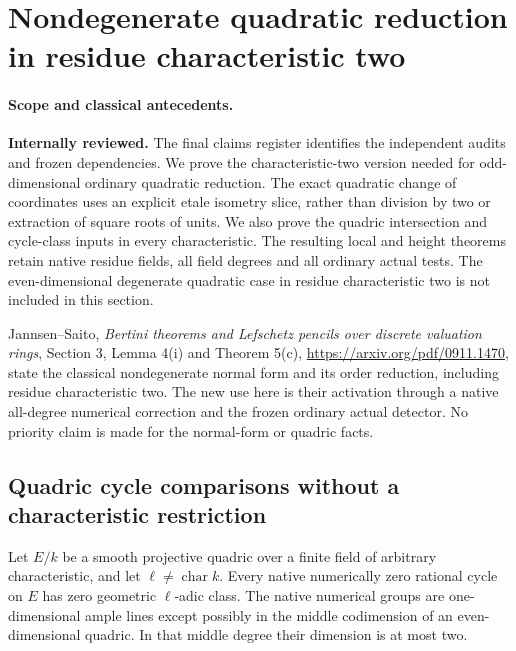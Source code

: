 \section{Nondegenerate quadratic reduction in residue characteristic two}
\label{r17c2:section}

\paragraph{Scope and classical antecedents.}
\textbf{Internally reviewed.} The final claims register identifies the independent audits and frozen dependencies.
We prove the characteristic-two version needed for odd-dimensional
ordinary quadratic reduction. The exact quadratic change of
coordinates uses an explicit etale isometry slice, rather than division
by two or extraction of square roots of units. We also prove
the quadric intersection and cycle-class inputs in every
characteristic. The resulting local and height theorems retain
native residue fields, all field degrees and all ordinary actual
tests. The even-dimensional degenerate quadratic case in residue
characteristic two is not included in this section.

Jannsen--Saito, \emph{Bertini theorems and Lefschetz pencils over
discrete valuation rings}, Section 3, Lemma 4(i) and Theorem 5(c),
\url{https://arxiv.org/pdf/0911.1470}, state the classical
nondegenerate normal form and its order reduction, including
residue characteristic two. The new use here is their activation
through a native all-degree numerical correction and the frozen
ordinary actual detector. No priority claim is made for the
normal-form or quadric facts.

\subsection{Quadric cycle comparisons without a characteristic restriction}

\begin{lemma}
\label{r17c2:quadric-cycles}
Let $E/k$ be a smooth projective quadric over a finite field
of arbitrary characteristic, and let $\ell\ne\operatorname{char}k$.
Every native numerically zero rational cycle on $E$ has zero
geometric $\ell$-adic class. The native numerical groups are
one-dimensional ample lines except possibly in the middle
codimension of an even-dimensional quadric. In that middle
degree their dimension is at most two.
\end{lemma}


